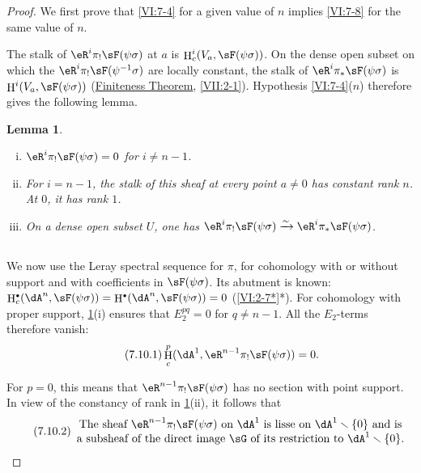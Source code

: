 \documentclass[12pt,oneside,english]{smfbook}
\DeclareMathOperator{\h}{H}
\newcommand{\iso}{\xrightarrow\sim}
\renewcommand{\setminus}{\smallsetminus}
\newtheorem{lemma_}[subsection]{Lemma}
\let\oldbullet\bullet
\renewcommand{\bullet}{\textnormal{\tiny$\oldbullet$}}
\begin{document}
\begin{proof}
We first prove that \ref{VI:7-4} for a given value of $n$ implies \ref{VI:7-8} for the same value of $n$.

The stalk of $\eR^i\pi_!\sF(\psi\sigma)$ at $a$ is $\h_c^i(V_a,\sF(\psi\sigma))$. On the dense open subset on which the $\eR^i\pi_!\sF(\psi^{-1}\sigma)$ are locally constant, the stalk of $\eR^i\pi_\ast\sF(\psi\sigma)$ is $\h^i(V_a,\sF(\psi\sigma))$ (\hyperref[VII]{Finiteness Theorem}, \ref{VII:2-1}). Hypothesis \ref{VI:7-4}($n$) therefore gives the following lemma.

\begin{lemma_}\label{VI:7-9}
\begin{enumerate}[(i)]
  \item $\eR^i\pi_!\sF(\psi\sigma)=0$ for $i\ne n-1$.
  \item For $i=n-1$, the stalk of this sheaf at every point $a\ne0$ has constant rank $n$. At $0$, it has rank $1$.
  \item On a dense open subset $U$, one has $\eR^i\pi_!\sF(\psi\sigma)\iso \eR^i\pi_\ast\sF(\psi\sigma)$.
\end{enumerate}
\end{lemma_}

\subsection{}\label{VI:7-10}

We now use the Leray spectral sequence for $\pi$, for cohomology with or without support and with coefficients in $\sF(\psi\sigma)$. Its abutment is known: $\h_c^\bullet(\dA^n,\sF(\psi\sigma)) =\h^\bullet(\dA^n,\sF(\psi\sigma))=0$ (\ref{VI:2-7*}*). For cohomology with proper support, \ref{VI:7-9}(i) ensures that $E_2^{pq}=0$ for $q\ne n-1$. All the $E_2$-terms therefore vanish:
\begin{equation*}\tag{7.10.1}\label{VI:eq:7-10-1}
  \h_c^p(\dA^1,\eR^{n-1} \pi_!\sF(\psi\sigma)) = 0 \text{.}
\end{equation*}

For $p=0$, this means that $\eR^{n-1}\pi_!\sF(\psi\sigma)$ has no section with point support. In view of the constancy of rank in \ref{VI:7-9}(ii), it follows that
\begin{equation*}\tag{7.10.2}\label{VI:eq:7-10-2}
  \begin{array}{c}
    \text{The sheaf $\eR^{n-1}\pi_!\sF(\psi\sigma)$ on $\dA^1$ is lisse on
    $\dA^1\setminus\{0\}$ and is}\\
    \text{a subsheaf of the direct image $\sG$ of its restriction to
    $\dA^1\setminus\{0\}$.}
  \end{array}
\end{equation*}


\end{proof}
\end{document}
